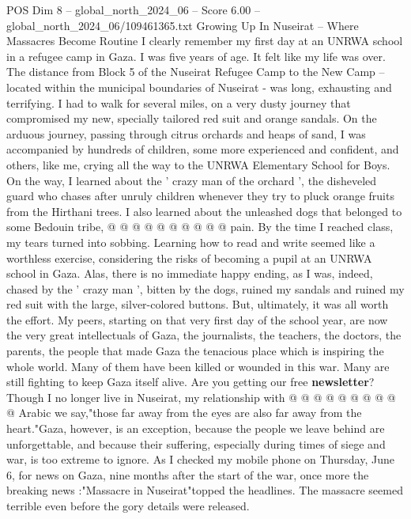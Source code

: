 \begin{textsample}{POS Dim 8 – global\_north\_2024\_06 – Score 6.00 – global\_north\_2024\_06/109461365.txt}  \label{ex:f8_pos_251}
Growing Up In Nuseirat -- Where Massacres Become Routine I clearly remember my first day at an UNRWA school in a refugee camp in Gaza.
I was five years of age.
It felt like my life was over.
The distance from Block 5 of the Nuseirat Refugee Camp to the New Camp -- located within the municipal boundaries of Nuseirat - was long, exhausting and terrifying.
I had to walk for several miles, on a very dusty journey that compromised my new, specially tailored red suit and orange sandals.
On the arduous journey, passing through citrus orchards and heaps of sand, I was accompanied by hundreds of children, some more experienced and confident, and others, like me, crying all the way to the UNRWA Elementary School for Boys.
On the way, I learned about the ' crazy man of the orchard ', the disheveled guard who chases after unruly children whenever they try to pluck orange fruits from the Hirthani trees.
I also learned about the unleashed dogs that belonged to some Bedouin tribe, @ @ @ @ @ @ @ @ @ @ pain.
By the time I reached class, my tears turned into sobbing.
Learning how to read and write seemed like a worthless exercise, considering the risks of becoming a pupil at an UNRWA school in Gaza.
Alas, there is no immediate happy ending, as I was, indeed, chased by the ' crazy man ', bitten by the dogs, ruined my sandals and ruined my red suit with the large, silver-colored buttons.
But, ultimately, it was all worth the effort.
My peers, starting on that very first day of the school year, are now the very great intellectuals of Gaza, the journalists, the teachers, the doctors, the parents, the people that made Gaza the tenacious place which is inspiring the whole world.
Many of them have been killed or wounded in this war.
Many are still fighting to keep Gaza itself alive.
Are you getting our free \textbf{newsletter}?
Though I no longer live in Nuseirat, my relationship with @ @ @ @ @ @ @ @ @ @ Arabic we say,"those far away from the eyes are also far away from the heart."Gaza, however, is an exception, because the people we leave behind are unforgettable, and because their suffering, especially during times of siege and war, is too extreme to ignore.
As I checked my mobile phone on Thursday, June 6, for news on Gaza, nine months after the start of the war, once more the breaking news :"Massacre in Nuseirat"topped the headlines.
The massacre seemed terrible even before the gory details were released.

\end{textsample}
